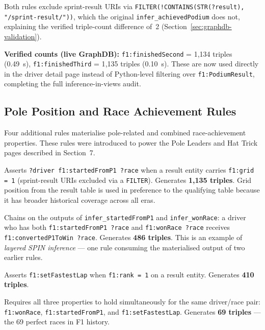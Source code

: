 \documentclass[12pt,a4paper]{article}
\begin{document}
Both rules exclude sprint-result URIs via \texttt{FILTER(!CONTAINS(STR(?result), "/sprint-result/"))},
which the original \texttt{infer\_achievedPodium} does not, explaining the verified
triple-count difference of~2 (Section~\ref{sec:graphdb-validation}).

\textbf{Verified counts (live GraphDB):}
\texttt{f1:finishedSecond} = 1{,}134 triples (0.49~s),
\texttt{f1:finishedThird} = 1{,}135 triples (0.10~s).
These are now used directly in the driver detail page instead of Python-level
filtering over \texttt{f1:PodiumResult}, completing the full inference-in-views audit.

\subsection{Pole Position and Race Achievement Rules}

Four additional rules materialise pole-related and combined race-achievement properties.
These rules were introduced to power the Pole Leaders and Hat Trick pages described in
Section~7.

\begin{description}[leftmargin=2em]
  \item[\texttt{infer\_startedFromP1}]
    Asserts \texttt{?driver f1:startedFromP1 ?race} when a result entity carries
    \texttt{f1:grid = 1} (sprint-result URIs excluded via a \texttt{FILTER}).
    Generates \textbf{1{,}135 triples}.
    Grid position from the result table is used in preference to the qualifying table
    because it has broader historical coverage across all eras.

  \item[\texttt{infer\_convertedP1ToWin}]
    Chains on the outputs of \texttt{infer\_startedFromP1} and \texttt{infer\_wonRace}:
    a driver who has both \texttt{f1:startedFromP1 ?race} and
    \texttt{f1:wonRace ?race} receives \texttt{f1:convertedP1ToWin ?race}.
    Generates \textbf{486 triples}. This is an example of \emph{layered SPIN
    inference} --- one rule consuming the materialised output of two earlier rules.

  \item[\texttt{infer\_setFastestLap}]
    Asserts \texttt{f1:setFastestLap} when \texttt{f1:rank = 1} on a result entity.
    Generates \textbf{410 triples}.

  \item[\texttt{infer\_achievedHatTrick}]
    Requires all three properties to hold simultaneously for the same driver/race pair:
    \texttt{f1:wonRace}, \texttt{f1:startedFromP1}, and \texttt{f1:setFastestLap}.
    Generates \textbf{69 triples} --- the 69 perfect races in F1 history.
\end{description}
\end{document}
